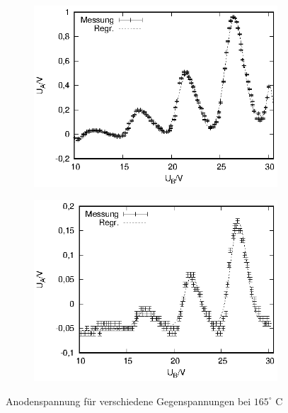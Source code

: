 \begin{figure}[!h]
\begin{subfigure}[h]{0.5\textwidth}
    \includegraphics{data/fh/165K3V.eps}
  \end{subfigure}%
  \begin{subfigure}[h]{0.5\textwidth}
    \centering
    \includegraphics{data/fh/165K4V.eps}
  \end{subfigure}
  \caption{Anodenspannung für verschiedene Gegenspannungen bei $165^\circ$ C}
  \label{fig:kennlinien2}
\end{figure}

\newpage

